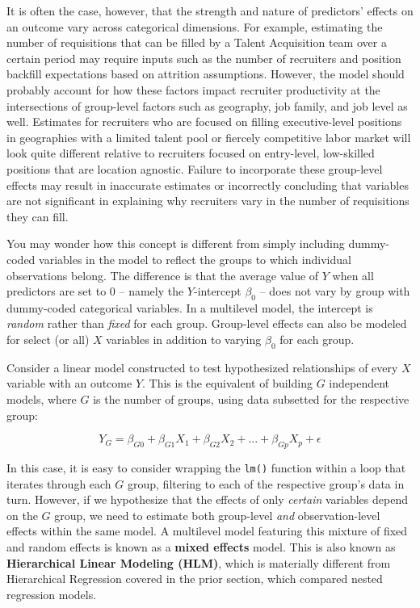 \documentclass[
]{book}
\begin{document}
It is often the case, however, that the strength and nature of predictors' effects on an outcome vary across categorical dimensions. For example, estimating the number of requisitions that can be filled by a Talent Acquisition team over a certain period may require inputs such as the number of recruiters and position backfill expectations based on attrition assumptions. However, the model should probably account for how these factors impact recruiter productivity at the intersections of group-level factors such as geography, job family, and job level as well. Estimates for recruiters who are focused on filling executive-level positions in geographies with a limited talent pool or fiercely competitive labor market will look quite different relative to recruiters focused on entry-level, low-skilled positions that are location agnostic. Failure to incorporate these group-level effects may result in inaccurate estimates or incorrectly concluding that variables are not significant in explaining why recruiters vary in the number of requisitions they can fill.

You may wonder how this concept is different from simply including dummy-coded variables in the model to reflect the groups to which individual observations belong. The difference is that the average value of \(Y\) when all predictors are set to 0 -- namely the \(Y\)-intercept \(\beta_0\) -- does not vary by group with dummy-coded categorical variables. In a multilevel model, the intercept is \emph{random} rather than \emph{fixed} for each group. Group-level effects can also be modeled for select (or all) \(X\) variables in addition to varying \(\beta_0\) for each group.

Consider a linear model constructed to test hypothesized relationships of every \(X\) variable with an outcome \(Y\). This is the equivalent of building \(G\) independent models, where \(G\) is the number of groups, using data subsetted for the respective group:

\[ Y_G = \beta_{G0} + \beta_{G1} X_1 + \beta_{G2} X_2 + {...} + \beta_{Gp} X_p + \epsilon \]

In this case, it is easy to consider wrapping the \texttt{lm()} function within a loop that iterates through each \(G\) group, filtering to each of the respective group's data in turn. However, if we hypothesize that the effects of only \emph{certain} variables depend on the \(G\) group, we need to estimate both group-level \emph{and} observation-level effects within the same model. A multilevel model featuring this mixture of fixed and random effects is known as a \textbf{mixed effects} model. This is also known as \textbf{Hierarchical Linear Modeling (HLM)}, which is materially different from Hierarchical Regression covered in the prior section, which compared nested regression models.
\end{document}
